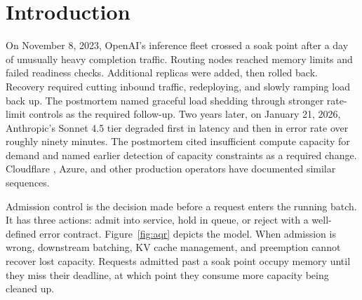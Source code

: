 \section{Introduction}

On November 8, 2023, OpenAI's inference fleet crossed a soak point after
a day of unusually heavy completion traffic. Routing nodes reached
memory limits and failed readiness checks. Additional replicas were
added, then rolled back. Recovery required cutting inbound traffic,
redeploying, and slowly ramping load back up. The postmortem named
graceful load shedding through stronger rate-limit controls as the
required follow-up. Two years later, on January 21, 2026, Anthropic's
Sonnet 4.5 tier degraded first in latency and then in error rate over
roughly ninety minutes. The postmortem cited insufficient compute
capacity for demand and named earlier detection of capacity constraints
as a required change. Cloudflare \citep{cloudflare_ratelimit_2017,cloudflare_ratelimit_2022}, Azure, and other production operators
have documented similar sequences.

Admission control is the decision made before a request enters the
running batch. It has three actions: admit into service, hold in queue,
or reject with a well-defined error contract. Figure~\ref{fig:aqr}
depicts the model. When admission is wrong, downstream batching, KV
cache management, and preemption cannot recover lost capacity. Requests
admitted past a soak point occupy memory until they miss their
deadline, at which point they consume more capacity being cleaned up.

